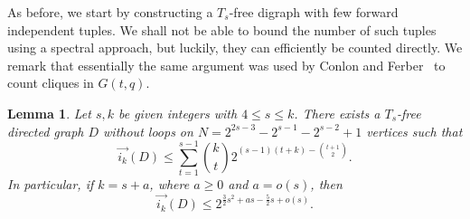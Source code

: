 \documentclass{article}
\theoremstyle{plain}
\newtheorem{lemma}[theorem]{Lemma}
\theoremstyle{definition}
\newcommand{\fwi}[1]{\overrightarrow{i_{#1}}}
\begin{document}
As before, we start by constructing a $T_s$-free digraph with few forward independent tuples. We shall not be able to bound the number of such tuples using a spectral approach, but luckily, they can efficiently be counted directly. We remark that essentially the same argument was used by Conlon and Ferber~\cite{conlon-ferber} to count cliques in $G(t, q)$.
\begin{lemma} \label{lem:F2-fw-indep-sets}
    Let $s, k$ be given integers with $4 \le s \le k$. There exists a $T_s$-free directed graph $D$ without loops on $N = 2^{2s-3} - 2^{s-1} - 2^{s-2} + 1$ vertices such that 
    \[ \fwi{k}(D) \le \sum_{t=1}^{s-1} \binom{k}{t} 2^{(s-1)(t+k) - \binom{t+1}{2}}. \]
    In particular, if $k = s+a$, where $a \ge 0$ and $a = o(s)$, then
    \[ \fwi{k}(D) \le 2^{\frac{3}{2}s^2 + as - \frac{5}{2}s + o(s)}. \]
\end{lemma}
\end{document}
